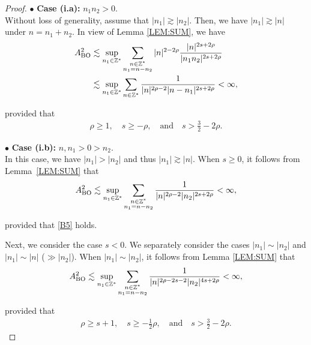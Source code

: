 \documentclass[letterpaper, 11pt,  reqno]{amsart}
\newcommand{\1}{\hspace{0.5mm}\text{I}\hspace{0.5mm}}
\newcommand{\noi}{\noindent}
\newcommand{\Z}{\mathbb{Z}}
\newcommand{\bul}{\bullet}
\newcommand{\les}{\lesssim}
\newcommand{\ges}{\gtrsim}
\newcommand{\BO}{\text{\rm BO} }
\numberwithin{equation}{section}
\numberwithin{theorem}{section}
\begin{document}
\begin{proof}
\medskip

\noi
$\bul$ {\bf Case (i.a):} $n_1 n_2 >0$.\\
\indent
Without loss of generality, assume that $|n_1|\ges |n_2|$.
Then, we have $|n_1|\ges |n|$ under $n = n_1 + n_2$.
In view of Lemma \ref{LEM:SUM}, we have 
\begin{align}
\begin{split}
A_\BO^2
& \les 
 \sup_{n_1\in \Z^*}
 \sum_{\substack{n\in \Z^*\\n_1 = n - n_2}}  |n|^{2-2\rho}
\frac{  |n|^{2s+2\rho}  }{  |n_1 n_2|^{2s+2\rho} }\\
& \les \sup_{n_1\in \Z^*}
\sum_{n\in \Z^*} 
\frac{1}{ |n|^{2\rho-2}
|n - n_1|^{2s+2\rho} }
< \infty, 
\end{split}
\label{B6}
\end{align}


\noi
provided that 
\begin{align}
\rho \ge 1, \quad s \ge - \rho, \quad
\text{and}\quad 
s > \frac 32 - 2 \rho.
\label{B5}
\end{align}


\medskip

\noi
$\bul$ {\bf Case (i.b):} $n, n_1>0>n_2$.\\
\indent
In this case, we have $|n_1| > |n_2|$ and thus $|n_1| \ges |n|$.
When  $s \ge 0$, it follows from Lemma~\ref{LEM:SUM} that 
\begin{align}
A_\BO^2\les  
\sup_{n_1\in \Z^*}
\sum_{\substack{n\in \Z^*\\ n_1 = n- n_2}}     \frac{ 1 }{  |n|^{ 2\rho - 2}  | n_2|^{2s+2\rho} }
< \infty, 
\label{B7}
\end{align}

\noi
provided that \eqref{B5} holds.


Next, 
we consider the case $s <  0$.
We separately consider the cases $|n_1| \sim |n_2|$ and $|n_1|\sim |n|$ ($\gg |n_2|$).
When $ |n_1| \sim |n_2|$, 
it follows from Lemma \ref{LEM:SUM} that 
\begin{align}
A_\BO^2\les  
\sup_{n_1\in \Z^*}
\sum_{\substack{n\in \Z^*\\ n_1 = n- n_2}}    
 \frac{ 1 }{  |n|^{ 2\rho -2s - 2}  | n_2|^{4s+2\rho} }
< \infty, 
\label{B7a}
\end{align}

\noi
provided that 
\begin{align}
\rho \ge s + 1, \quad s \ge -\frac 12  \rho, \quad
\text{and}\quad 
s > \frac 32 - 2 \rho.
\label{B7b}
\end{align}


\end{proof}
\end{document}

